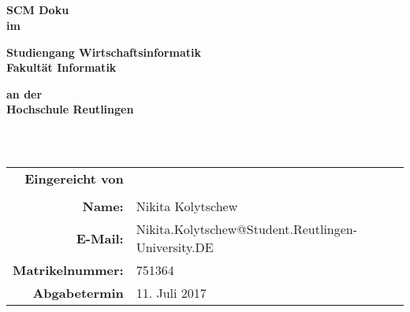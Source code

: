 \thispagestyle{empty}


\begin{figure}[t]
  \centering
\end{figure}

\begin{verbatim}


\end{verbatim}


\begin{verbatim}


\end{verbatim}

\begin{center}
  \doublespacing
  \textbf{\LARGE{SCM Doku}} \\
  \textbf{\small{im}}

  \singlespacing
  \textbf{Studiengang Wirtschaftsinformatik} \\
  \textbf{Fakultät Informatik}

  \doublespacing
  \textbf{\small{an der}} \\
  \textbf{Hochschule Reutlingen}
\end{center}

\begin{verbatim}



\end{verbatim}

\begin{center}
  \begin{tabular}{rll}
    \textbf{Eingereicht von} & & \\ \\
    \textbf{Name:} & Nikita Kolytschew & \\
    \textbf{E-Mail:} & Nikita.Kolytschew@Student.Reutlingen-University.DE & \\
    \textbf{Matrikelnummer:} & 751364 & \\
    
	  \textbf{Abgabetermin} & 11. Juli 2017 & \\
  \end{tabular}
\end{center}